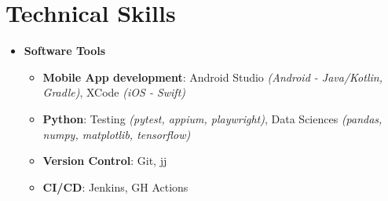 \section{\sectionheading Technical Skills}

\begin{itemize}[leftmargin=0pt, label={}]%

\item{
{\sectionheading\large{\textbf{Software Tools}}}

    \vspace{-7pt}
    \begin{itemize}[label=\textbullet, leftmargin=*, noitemsep]
        \item{
        \textbf{Mobile App development}: Android Studio \textit{(Android - Java/Kotlin, Gradle)}, XCode \textit{(iOS - Swift)}
        }
        \item{
        \textbf{Python}: Testing \textit{(pytest, appium, playwright)}, Data Sciences \textit{(pandas, numpy, matplotlib, tensorflow)}
        }
        \item{
        \textbf{Version Control}: Git, jj
        }
        \item{
        \textbf{CI/CD}: Jenkins, GH Actions
        }
    \end{itemize}
}

% 
\end{itemize}
